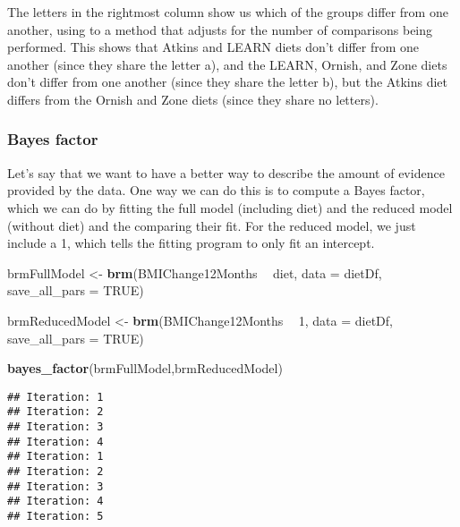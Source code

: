 \documentclass[]{book}
\newenvironment{Shaded}{\begin{snugshade}}{\end{snugshade}}
\newcommand{\KeywordTok}[1]{\textcolor[rgb]{0.13,0.29,0.53}{\textbf{#1}}}
\newcommand{\DataTypeTok}[1]{\textcolor[rgb]{0.13,0.29,0.53}{#1}}
\newcommand{\DecValTok}[1]{\textcolor[rgb]{0.00,0.00,0.81}{#1}}
\newcommand{\StringTok}[1]{\textcolor[rgb]{0.31,0.60,0.02}{#1}}
\newcommand{\OtherTok}[1]{\textcolor[rgb]{0.56,0.35,0.01}{#1}}
\newcommand{\OperatorTok}[1]{\textcolor[rgb]{0.81,0.36,0.00}{\textbf{#1}}}
\newcommand{\NormalTok}[1]{#1}
\theoremstyle{definition}
\theoremstyle{definition}
\theoremstyle{definition}
\theoremstyle{remark}
\begin{document}
The letters in the rightmost column show us which of the groups differ
from one another, using to a method that adjusts for the number of
comparisons being performed. This shows that Atkins and LEARN diets
don't differ from one another (since they share the letter a), and the
LEARN, Ornish, and Zone diets don't differ from one another (since they
share the letter b), but the Atkins diet differs from the Ornish and
Zone diets (since they share no letters).

\subsubsection{Bayes factor}\label{bayes-factor-1}

Let's say that we want to have a better way to describe the amount of
evidence provided by the data. One way we can do this is to compute a
Bayes factor, which we can do by fitting the full model (including diet)
and the reduced model (without diet) and the comparing their fit. For
the reduced model, we just include a 1, which tells the fitting program
to only fit an intercept.

\begin{Shaded}
\begin{Highlighting}[]
\NormalTok{brmFullModel <-}\StringTok{ }\KeywordTok{brm}\NormalTok{(BMIChange12Months }\OperatorTok{~}\StringTok{ }\NormalTok{diet, }\DataTypeTok{data =}\NormalTok{ dietDf,}
                    \DataTypeTok{save_all_pars =} \OtherTok{TRUE}\NormalTok{)}

\NormalTok{brmReducedModel <-}\StringTok{ }\KeywordTok{brm}\NormalTok{(BMIChange12Months }\OperatorTok{~}\StringTok{ }\DecValTok{1}\NormalTok{, }\DataTypeTok{data =}\NormalTok{ dietDf,}
                      \DataTypeTok{save_all_pars =} \OtherTok{TRUE}\NormalTok{)}
\end{Highlighting}
\end{Shaded}

\begin{Shaded}
\begin{Highlighting}[]
\KeywordTok{bayes_factor}\NormalTok{(brmFullModel,brmReducedModel)}
\end{Highlighting}
\end{Shaded}

\begin{verbatim}
## Iteration: 1
## Iteration: 2
## Iteration: 3
## Iteration: 4
## Iteration: 1
## Iteration: 2
## Iteration: 3
## Iteration: 4
## Iteration: 5
\end{verbatim}
\end{document}
